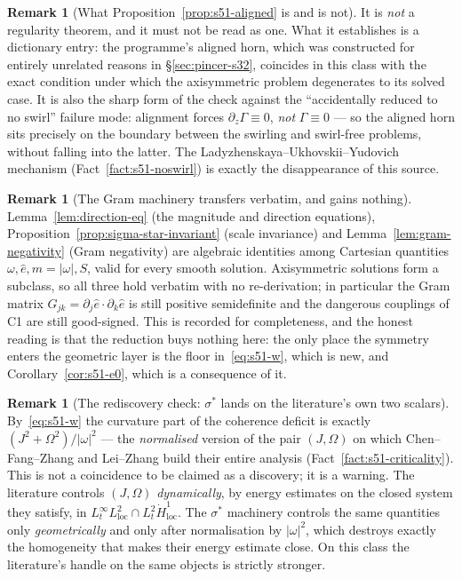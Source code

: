 \documentclass[11pt]{article}
\theoremstyle{definition}
\newtheorem{remark}[theorem]{Remark}
\theoremstyle{remark}
\begin{document}
\begin{remark}[What Proposition~\ref{prop:s51-aligned} is and is not]
  \label{rem:s51-aligned-scope}
  It is \emph{not} a regularity theorem, and it must not be read as one. What
  it establishes is a dictionary entry: the programme's aligned horn, which
  was constructed for entirely unrelated reasons in \S\ref{sec:pincer-s32},
  coincides in this class with the exact condition under which the
  axisymmetric problem degenerates to its solved case. It is also the sharp
  form of the check against the ``accidentally reduced to no swirl'' failure
  mode: alignment forces $\partial_z\Gamma\equiv0$, \emph{not} $\Gamma\equiv0$
  --- so the aligned horn sits precisely on the boundary between the swirling
  and swirl-free problems, without falling into the latter. The
  Ladyzhenskaya--Ukhovskii--Yudovich mechanism
  (Fact~\ref{fact:s51-noswirl}) is exactly the disappearance of this source.
\end{remark}

\begin{remark}[The Gram machinery transfers verbatim, and gains nothing]
  \label{rem:s51-gram}
  Lemma~\ref{lem:direction-eq} (the magnitude and direction equations),
  Proposition~\ref{prop:sigma-star-invariant} (scale invariance) and
  Lemma~\ref{lem:gram-negativity} (Gram negativity) are algebraic identities
  among Cartesian quantities $\omega,\hat e,m=|\omega|,S$, valid for every
  smooth solution. Axisymmetric solutions form a subclass, so all three hold
  verbatim with no re-derivation; in particular the Gram matrix
  $G_{jk}=\partial_j\hat e\cdot\partial_k\hat e$ is still positive
  semidefinite and the dangerous couplings of C1 are still good-signed. This
  is recorded for completeness, and the honest reading is that the reduction
  buys nothing here: the only place the symmetry enters the geometric layer is
  the floor in~\eqref{eq:s51-w}, which is new, and
  Corollary~\ref{cor:s51-e0}, which is a consequence of it.
\end{remark}

\begin{remark}[The rediscovery check: $\sigma^*$ lands on the literature's own
  two scalars]\label{rem:s51-rediscovery}
  By~\eqref{eq:s51-w} the curvature part of the coherence deficit is exactly
  $(J^2+\Omega^2)/|\omega|^2$ --- the \emph{normalised} version of the pair
  $(J,\Omega)$ on which Chen--Fang--Zhang \cite{ChenFangZhang2017} and
  Lei--Zhang \cite{LeiZhang2017} build their entire analysis
  (Fact~\ref{fact:s51-criticality}). This is not a coincidence to be claimed
  as a discovery; it is a warning. The literature controls $(J,\Omega)$
  \emph{dynamically}, by energy estimates on the closed system they satisfy,
  in $L^\infty_tL^2_{\mathrm{loc}}\cap L^2_t\dot H^1_{\mathrm{loc}}$. The
  $\sigma^*$ machinery controls the same quantities only \emph{geometrically}
  and only after normalisation by $|\omega|^2$, which destroys exactly the
  homogeneity that makes their energy estimate close. On this class the
  literature's handle on the same objects is strictly stronger.
\end{remark}
\end{document}
